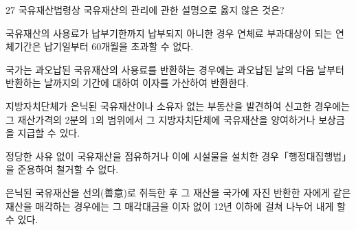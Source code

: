 \begin{question}{27}
국유재산법령상 국유재산의 관리에 관한 설명으로 옳지 않은 것은?
\begin{choices}
  \item 국유재산의 사용료가 납부기한까지 납부되지 아니한 경우 연체료 부과대상이 되는 연체기간은 납기일부터 60개월을 초과할 수 없다.
  \item 국가는 과오납된 국유재산의 사용료를 반환하는 경우에는 과오납된 날의 다음 날부터 반환하는 날까지의 기간에 대하여 이자를 가산하여 반환한다.
  \item 지방자치단체가 은닉된 국유재산이나 소유자 없는 부동산을 발견하여 신고한 경우에는 그 재산가격의 2분의 1의 범위에서 그 지방자치단체에 국유재산을 양여하거나 보상금을 지급할 수 있다.
  \item 정당한 사유 없이 국유재산을 점유하거나 이에 시설물을 설치한 경우「행정대집행법」을 준용하여 철거할 수 없다.
  \item 은닉된 국유재산을 선의(善意)로 취득한 후 그 재산을 국가에 자진 반환한 자에게 같은 재산을 매각하는 경우에는 그 매각대금을 이자 없이 12년 이하에 걸쳐 나누어 내게 할 수 있다.
\end{choices}
\end{question}

